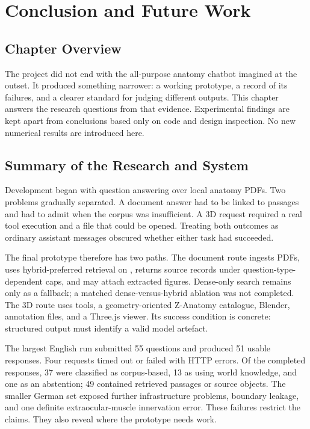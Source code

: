 \chapter{Conclusion and Future Work}
\label{chap:conclusion}

\section{Chapter Overview}
\label{sec:conclusion-overview}

The project did not end with the all-purpose anatomy chatbot imagined at the outset. It produced something narrower: a working prototype, a record of its failures, and a clearer standard for judging different outputs. This chapter answers the research questions from that evidence. Experimental findings are kept apart from conclusions based only on code and design inspection. No new numerical results are introduced here.

\section{Summary of the Research and System}
\label{sec:conclusion-summary}

Development began with question answering over local anatomy PDFs. Two problems gradually separated. A document answer had to be linked to passages and had to admit when the corpus was insufficient. A 3D request required a real tool execution and a file that could be opened. Treating both outcomes as ordinary assistant messages obscured whether either task had succeeded.

The final prototype therefore has two paths. The document route ingests PDFs, uses hybrid-preferred retrieval on , returns source records under question-type-dependent caps, and may attach extracted figures. Dense-only search remains only as a fallback; a matched dense-versus-hybrid ablation was not completed. The 3D route uses \MCP{} tools, a geometry-oriented Z-Anatomy catalogue, Blender, annotation files, and a Three.js viewer. Its success condition is concrete: structured output must identify a valid model artefact.

The largest English run submitted 55 questions and produced 51 usable responses. Four requests timed out or failed with HTTP errors. Of the completed responses, 37 were classified as corpus-based, 13 as using world knowledge, and one as an abstention; 49 contained retrieved passages or source objects. The smaller German set exposed further infrastructure problems, boundary leakage, and one definite extraocular-muscle innervation error. These failures restrict the claims. They also reveal where the prototype needs work.

